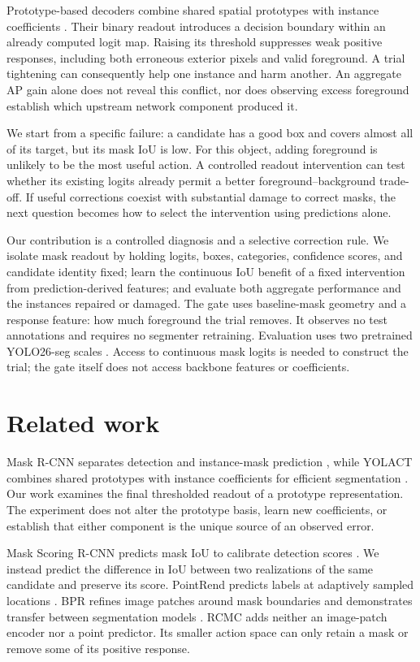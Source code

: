 \documentclass[times,twocolumn,final,authoryear]{elsarticle}
\begin{document}
Prototype-based decoders combine shared spatial prototypes with instance coefficients \citep{bolya2019yolact}. Their binary readout introduces a decision boundary within an already computed logit map. Raising its threshold suppresses weak positive responses, including both erroneous exterior pixels and valid foreground. A trial tightening can consequently help one instance and harm another. An aggregate AP gain alone does not reveal this conflict, nor does observing excess foreground establish which upstream network component produced it.

We start from a specific failure: a candidate has a good box and covers almost all of its target, but its mask IoU is low. For this object, adding foreground is unlikely to be the most useful action. A controlled readout intervention can test whether its existing logits already permit a better foreground--background trade-off. If useful corrections coexist with substantial damage to correct masks, the next question becomes how to select the intervention using predictions alone.

Our contribution is a controlled diagnosis and a selective correction rule. We isolate mask readout by holding logits, boxes, categories, confidence scores, and candidate identity fixed; learn the continuous IoU benefit of a fixed intervention from prediction-derived features; and evaluate both aggregate performance and the instances repaired or damaged. The gate uses baseline-mask geometry and a response feature: how much foreground the trial removes. It observes no test annotations and requires no segmenter retraining. Evaluation uses two pretrained YOLO26-seg scales \citep{jocher2026yolo26}. Access to continuous mask logits is needed to construct the trial; the gate itself does not access backbone features or coefficients.

\section{Related work}
Mask R-CNN separates detection and instance-mask prediction \citep{he2017maskrcnn}, while YOLACT combines shared prototypes with instance coefficients for efficient segmentation \citep{bolya2019yolact}. Our work examines the final thresholded readout of a prototype representation. The experiment does not alter the prototype basis, learn new coefficients, or establish that either component is the unique source of an observed error.

Mask Scoring R-CNN predicts mask IoU to calibrate detection scores \citep{huang2019maskscoring}. We instead predict the difference in IoU between two realizations of the same candidate and preserve its score. PointRend predicts labels at adaptively sampled locations \citep{kirillov2020pointrend}. BPR refines image patches around mask boundaries and demonstrates transfer between segmentation models \citep{tang2021bpr}. RCMC adds neither an image-patch encoder nor a point predictor. Its smaller action space can only retain a mask or remove some of its positive response.
\end{document}

